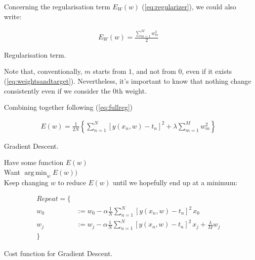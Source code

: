 \noindent Concerning the regularisation term $E_W(w)$ (\ref{eq:regularizer}), we could also write:

\begin{Equation}[H]
	\centering
	\begin{equation} \label{eq:regnew}
		\begin{aligned}
			E_W(w) = \frac{ \sum_{m=1}^{M} {w^2_m}}{2}
		\end{aligned}
	\end{equation}
	\caption[Regularisation term.]{Regularisation term.}
\end{Equation}

\noindent Note that, conventionally, $m$ starts from $1$, and not from $0$, even if it exists (\ref{eq:weightsandtarget}). Nevertheless, it's important to know that nothing change consistently even if we consider the 0th weight. 

\noindent Combining together following (\ref{eq:fullreg}) 

\begin{Equation}[H]
	\centering
	\begin{equation} \label{eq:fullregnew}
	\begin{aligned}
	E(w) = \frac{1}{2N} \left\{ \sum_{n=1}^{N} [ y(x_n,w)-t_n ]^2 + \lambda \sum_{m=1}^{M} {w^2_m} \right\}
	\end{aligned}
	\end{equation}
	\caption{Gradient Descent.}
\end{Equation}

\noindent Have some function $E(w)$ \\
\noindent Want $\operatorname*{arg\,min}_w  E(w))$ \\

\noindent Keep changing $w$ to reduce $E(w)$ until we hopefully end up at a minimum:

\begin{Equation}[H]
	\centering
	\begin{equation} \label{eq:graddesc}
		\begin{aligned}
			Repeat = \{ \\
				w_0 &:= w_0 - \alpha \frac{1}{N} \sum_{n=1}^{N} [ y(x_n,w)-t_n ]^2 \, x_0 \\
				w_j &:= w_j - \alpha \frac{1}{N} \sum_{n=1}^{N} [ y(x_n,w)-t_n ]^2 \, x_j + \frac{\lambda}{M} w_j\\
			\}
		\end{aligned}
	\end{equation}
	\caption[Gradient Descent.]{Cost function for Gradient Descent.}
\end{Equation}

